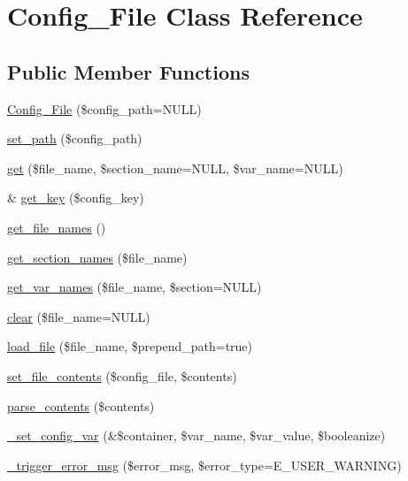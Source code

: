\hypertarget{class_config___file}{}\section{Config\+\_\+\+File Class Reference}
\label{class_config___file}
\subsection*{Public Member Functions}
\begin{DoxyCompactItemize}
\item 
\mbox{\hyperlink{class_config___file_aca7833d633dfdb20287c9596e386790d}{Config\+\_\+\+File}} (\$config\+\_\+path=N\+U\+LL)
\item 
\mbox{\hyperlink{class_config___file_afd02d9b052d474f69b9b0040c33b47bc}{set\+\_\+path}} (\$config\+\_\+path)
\item 
\mbox{\hyperlink{class_config___file_a23679231c0a913334b147f7df83c2a77}{get}} (\$file\+\_\+name, \$section\+\_\+name=N\+U\+LL, \$var\+\_\+name=N\+U\+LL)
\item 
\& \mbox{\hyperlink{class_config___file_ac922d3e712db53b74e8fa1b70dc85ab1}{get\+\_\+key}} (\$config\+\_\+key)
\item 
\mbox{\hyperlink{class_config___file_a1ddcf0e43f022559bf8e8ecfaf98a1bc}{get\+\_\+file\+\_\+names}} ()
\item 
\mbox{\hyperlink{class_config___file_a87a9f1ba0feaebb36833ffba7af5b398}{get\+\_\+section\+\_\+names}} (\$file\+\_\+name)
\item 
\mbox{\hyperlink{class_config___file_a1cc9733d0fbe7253d814110ee83ba385}{get\+\_\+var\+\_\+names}} (\$file\+\_\+name, \$section=N\+U\+LL)
\item 
\mbox{\hyperlink{class_config___file_ad5c7a23104aa4e60e5206d45f12b213f}{clear}} (\$file\+\_\+name=N\+U\+LL)
\item 
\mbox{\hyperlink{class_config___file_a60cecc7ed22569ca42611cecec809c7d}{load\+\_\+file}} (\$file\+\_\+name, \$prepend\+\_\+path=true)
\item 
\mbox{\hyperlink{class_config___file_abbf387cf6ebd3a432bad2ad1d697f6c0}{set\+\_\+file\+\_\+contents}} (\$config\+\_\+file, \$contents)
\item 
\mbox{\hyperlink{class_config___file_a9088a915a8830c054e1c20efdf982288}{parse\+\_\+contents}} (\$contents)
\item 
\mbox{\hyperlink{class_config___file_a395dfc55bb2ce7e6126e453e7d7c3c59}{\+\_\+set\+\_\+config\+\_\+var}} (\&\$container, \$var\+\_\+name, \$var\+\_\+value, \$booleanize)
\item 
\mbox{\hyperlink{class_config___file_ac875b1d5870a59fda17bbdb25c792b17}{\+\_\+trigger\+\_\+error\+\_\+msg}} (\$error\+\_\+msg, \$error\+\_\+type=E\+\_\+\+U\+S\+E\+R\+\_\+\+W\+A\+R\+N\+I\+NG)
\end{DoxyCompactItemize}
